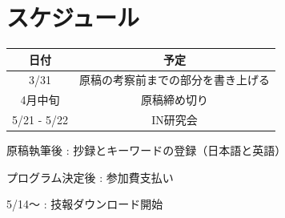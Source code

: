 \documentclass[a4j]{jarticle}
\begin{document}
\section{スケジュール}
\begin{table}[tb]
\begin{tabular}{|c|c|}
\hline
日付&予定\\
\hline
3/31&原稿の考察前までの部分を書き上げる\\
\hline
4月中旬&原稿締め切り\\
\hline
5/21 - 5/22&IN研究会\\
\hline
\end{tabular}
\end{table}
原稿執筆後 : 抄録とキーワードの登録（日本語と英語）

プログラム決定後 : 参加費支払い

5/14～ : 技報ダウンロード開始
\end{document}

